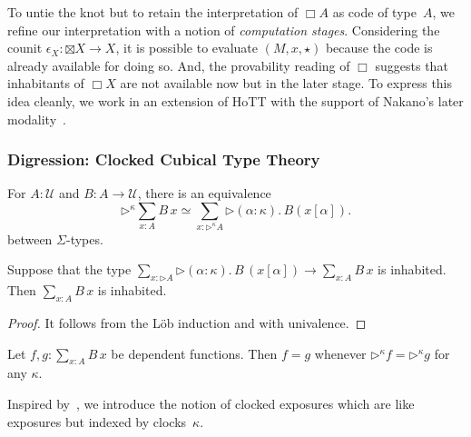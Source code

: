 \documentclass[a4paper,UKenglish,numberwithinsect,cleveref,thm-restate]{lipics-v2021}
\numberwithin{equation}{section}
\newcommand{\eqv}[2]{\ensuremath{#1 \simeq #2}\xspace}
\newcommand{\laterp}{\mathord{\triangleright}}
\newcommand{\Univ}{\mathcal{U}}
\theoremstyle{plain}
\begin{document}
To untie the knot but to retain the interpretation of $\Box A$ as code of type~$A$, we refine our interpretation with a notion of \emph{computation stages}. 
Considering the counit $\epsilon_X\colon \boxtimes X \to X$, it is possible to evaluate $(M, x, \star)$ because the code is already available for doing so.
And, the provability reading of $\Box$ suggests that inhabitants of $\Box X$ are not available now but in the later stage.
To express this idea cleanly, we work in an extension of HoTT with the support of Nakano's later modality~\cite{Nakano2000}.

\subsubsection{Digression: Clocked Cubical Type Theory}

\begin{lemma}\label{lem:later-sum}
  For $A : \Univ$ and $B : A \to \Univ$, there is an equivalence
  \[
    \eqv{\laterp^\kappa \sum_{x : A} B\,x}{\sum_{x : \laterp^\kappa A} \laterp (\alpha : \kappa).\, B (x [\alpha])}.
  \]
  between $\Sigma$-types.
\end{lemma}

\begin{corollary} \label{coro:lob-induction-sum}
  Suppose that the type $\sum_{x : \laterp A} \laterp (\alpha : \kappa).\,B\,(x[\alpha]) \to \sum_{x : A} B\,x$ is inhabited.
  Then $\sum_{x : A} B\,x$ is inhabited.
\end{corollary}
\begin{proof}
  It follows from the Löb induction and  with univalence.
\end{proof}

\begin{lemma}\label{lem:later-identity}
  Let $f, g : \sum_{x : A} B\,x$ be dependent functions.
  Then $f = g$ whenever $\laterp^\kappa f = \laterp^\kappa g$ for any $\kappa$. 
\end{lemma}

Inspired by~, we introduce the notion of clocked exposures which are like exposures but indexed by clocks~$\kappa$.
\end{document}
